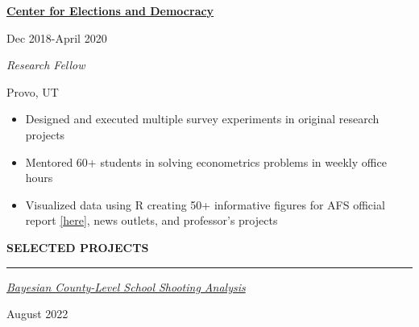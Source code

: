 \documentclass[
  16,
]{article}
\providecommand{\tightlist}{%
  \setlength{\itemsep}{0pt}\setlength{\parskip}{0pt}}\usepackage{longtable,booktabs,array}
\begin{document}
\begin{large}
  \begin{multicols}{2}
    \begin{flushleft}{\bf \href{http://csed.byu.edu/}{Center for Elections and Democracy}}\end{flushleft}
    \begin{flushright}Dec 2018-April 2020\end{flushright}
  \end{multicols}
  \vspace{-0.17cm}
  \begin{multicols}{2}
    \begin{flushleft}\textit{Research Fellow}\end{flushleft}
    \begin{flushright}Provo, UT\end{flushright}
  \end{multicols}
\end{large}
\vspace{-0.16cm}

\begin{itemize}
\tightlist
\item
  Designed and executed multiple survey experiments in original research
  projects
\item
  Mentored 60+ students in solving econometrics problems in weekly
  office hours
\item
  Visualized data using R creating 50+ informative figures for AFS
  official report
  \href{https://csed.byu.edu/0000017e-2611-d5d4-a57f-277126ef0001/american-family-survey-2019-report-pdf}{[here]},
  news outlets, and professor's projects
\end{itemize}

\vspace{7pt}

\begin{large}
{\bf SELECTED PROJECTS}
  \vspace{3pt}
  \hrule
  \begin{multicols}{2}
    \begin{flushleft}\textit{\href{https://github.com/acbass49/school-shootings}{Bayesian County-Level School Shooting Analysis}}\end{flushleft}
    \begin{flushright}August 2022\end{flushright}
  \end{multicols}
  \vspace{-0.17cm}
\end{large}
\end{document}
